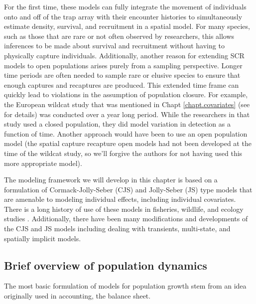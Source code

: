 For the first time, these models can fully
integrate the movement of individuals onto and off of the trap array
with their encounter histories to simultaneously estimate density,
survival, and recruitment in a spatial model.
For many species, such
as those that are rare or not often observed by researchers, this allows 
inferences to be made about survival and recruitment without having
to physically capture individuals.
Additionally, another reason for
extending SCR models to open populations arises purely from a
sampling perspective.  Longer time periods are often needed to sample
rare or elusive species to ensure that enough captures and recaptures
are produced.  This extended time frame can quickly lead to violations
in the assumption of population closure.  For example, the European
wildcat study that was mentioned in Chapt \ref{chapt.covariates} (see
\citet{kery_etal:2011} for details) was
conducted over a year long period.  While the researchers in that
study used a closed population, they did model variation in detection
as a function of time.  Another approach would have been to use an
open population model (the spatial capture recapture open models had
not been developed at the time of the wildcat study, so we'll forgive
the authors for not having used this more appropriate model).

The modeling framework we will develop in this chapter is based on a
formulation of Cormack-Jolly-Seber (CJS) and Jolly-Seber (JS) type
models \citep{cormack:1964, jolly:1965, seber:1965} that are amenable
to modeling individual effects, including individual covariates.
There is a long history of use of these models in fisheries, wildlife,
and ecology studies \citep{pollock_etal:1990, lebreton_etal:1992,
  pradel:1996, williams_etal:2002, schwarz_arnason:2005, gimenez:2007}.
Additionally, there have been many modifications and developments of
the CJS and JS models including dealing with transients, multi-state,
and spatially implicit models.

\subsection{Brief overview of population dynamics}

The most basic formulation of models for population growth stem from an idea originally used
in accounting, the balance sheet.


